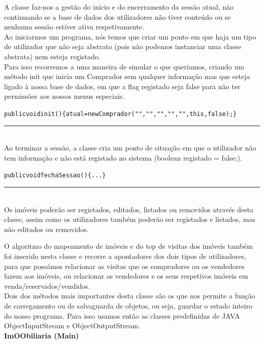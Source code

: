\documentclass[12pt]{article}
\newenvironment{code}                    
{\textbf{
} \hspace{1cm} \hrulefill \\ 
\smallskip 
\begin{center}
\begin{minipage}{0.9\textwidth} 
\begin{alltt}\small}
{\end{alltt}
\end{minipage}
\end{center}
\hrule\smallskip
}
\begin{document}
A classe faz-nos a gestão do inicio e do encerramento da sessão atual, não continuando se a base de dados dos utilizadores não tiver conteúdo ou se nenhuma sessão estiver ativa respetivamente.
\\
Ao iniciarmos um programa, nós temos que criar um ponto em que haja um tipo de utilizador que não seja abstrato (pois não podemos instanciar uma classe abstrata) nem esteja registado.\\
Para isso recorremos a uma maneira de simular o que queriamos, criando um método init que inicia um Comprador sem qualquer informação mas que esteja ligado à nossa base de dados, em que a flag registado seja false para não ter permissões aos nossos menus especiais.
\newline
\begin{code}
   public void init()\{atual = new Comprador ("","","","","",this,false);\}
\end{code}
~\\
Ao terminar a sessão, a classe cria um ponto de situação em que o utilizador não tem informação e não está registado no sistema (boolean registado = false;).
\newline
\begin{code}
public void fechaSessao()\{... \}
\end{code}
~\\

Os imóveis poderão ser registados, editados, listados ou removidos através desta classe, assim como os utilizadores também poderão ser registados e listados, mas não editados ou removidos.

O algoritmo do mapeamento de imóveis e do top de visitas dos imóveis também foi inserido nesta classe e recorre a apontadores dos dois tipos de utilizadores, para que possámos relacionar as visitas que os compradores ou os vendedores fazem aos imóveis, ou relacionar os vendedores e os seus respetivos imóveis em venda/reservados/vendidos.
~\\

Dois dos métodos mais importantes desta classe são os que nos permite a função de carregamento ou de salvaguarda de objetos, ou seja, guardar o estado inteiro do nosso programa.
Para isso usamos então as classes predefinidas de JAVA ObjectInputStream e ObjectOutputStream. 
~\\

\textbf{ImOObiliaria (Main)}
\newline
~\\
\end{document}

